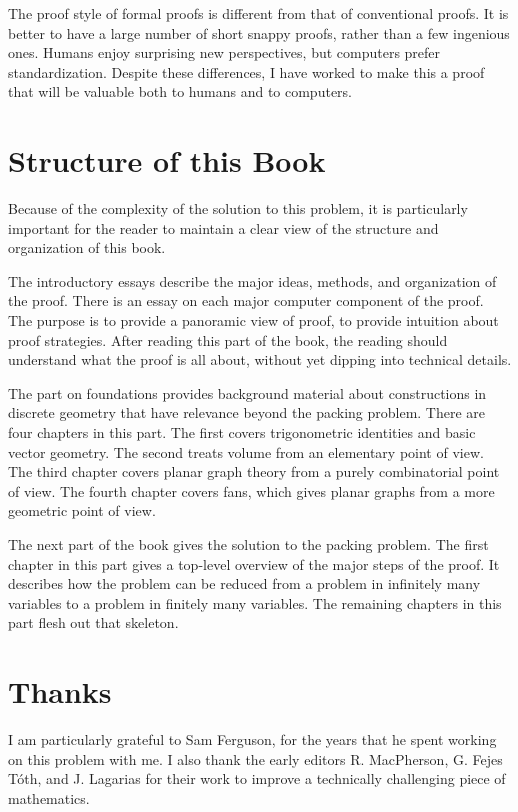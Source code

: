The proof style of formal proofs is different from that of
conventional proofs.  It is better to have a large number of short
snappy proofs, rather than a few ingenious ones.  Humans enjoy
surprising new perspectives, but computers prefer standardization.
Despite these differences, I have worked to make this a proof that
will be valuable both to humans and to computers.


\section{Structure of this Book}

Because of the complexity of the solution to this problem, it is particularly important for the reader to maintain a clear view of the structure and organization of this book. 


The introductory essays describe the major ideas,  methods, and organization of the proof.  There is an essay on each major computer component of the proof. The purpose is to provide a panoramic view of proof, to provide intuition about proof strategies.  After reading this part of the book, the reading should understand what the proof is all about, without yet dipping into technical details.  

The part on foundations provides background material about constructions in discrete geometry that have relevance beyond the packing problem.  There are four chapters in this part.  The first covers trigonometric identities and basic vector geometry.  The second treats volume from an elementary point of view.  The third chapter covers planar graph theory from a purely combinatorial point of view.  The fourth chapter covers fans, which gives planar graphs from a more geometric point of view.

The next part of the book gives the solution to the packing problem.  The first chapter in this part gives a top-level overview of the major steps of the proof.  It describes how the problem can be reduced from a problem in infinitely many variables to a problem in finitely many variables.  The remaining chapters in this part flesh out that skeleton.






\section{Thanks}

I am particularly grateful to Sam Ferguson, for the years that
he spent working on this problem with me.  I also thank the early editors
R. MacPherson, G. Fejes T\'oth, and J. Lagarias for their work
to improve a technically challenging piece of mathematics.  

